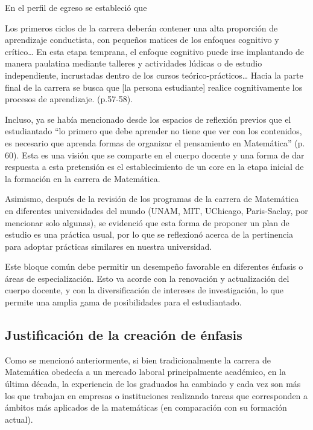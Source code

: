 \begin{refsection}
En el perfil de egreso se estableció que

\begin{center}
\begin{minipage}{0.75\linewidth}
        \vspace{5pt}%
        {\small
                Los primeros ciclos de la carrera deberán contener una alta proporción de aprendizaje conductista, con pequeños matices de los enfoques cognitivo y crítico… En esta etapa temprana, el enfoque cognitivo puede irse implantando de manera paulatina mediante talleres y actividades lúdicas o de estudio independiente, incrustadas dentro de los cursos teórico-prácticos… Hacia la parte final de la carrera se busca que [la persona estudiante] realice cognitivamente los procesos de aprendizaje. (p.57-58).
        }
        \vspace{5pt}%
    \end{minipage}
\end{center}

Incluso, ya se había mencionado desde los espacios de reflexión previos que el estudiantado “lo primero que debe aprender no tiene que ver con los contenidos, es
necesario que aprenda formas de organizar el pensamiento en Matemática” (p. 60). Esta es una visión que se comparte en el cuerpo docente y una forma de dar respuesta a esta pretensión es el establecimiento de un core en la etapa inicial de la formación en la carrera de Matemática.

Asimismo, después de la revisión de los programas de la carrera de Matemática en diferentes universidades del mundo (UNAM, MIT, UChicago, Paris-Saclay, por mencionar solo algunas), se evidenció que esta forma de proponer un plan de estudio es una práctica usual, por lo que se reflexionó acerca de la pertinencia para adoptar prácticas similares en nuestra universidad. 

Este bloque común debe permitir un desempeño favorable en diferentes énfasis o áreas de especialización. Esto va acorde con la renovación y actualización del cuerpo docente, y con la diversificación de intereses de investigación, lo que permite una amplia gama de posibilidades para el estudiantado.


\subsection{Justificación de la creación de énfasis}

Como se mencionó anteriormente, si bien tradicionalmente la carrera de Matemática obedecía a un mercado laboral principalmente académico, en la última década, la experiencia de los graduados ha cambiado y cada vez son más los que trabajan en empresas o instituciones realizando tareas que corresponden a ámbitos más aplicados de la matemáticas (en comparación con su formación actual).


\end{refsection}
